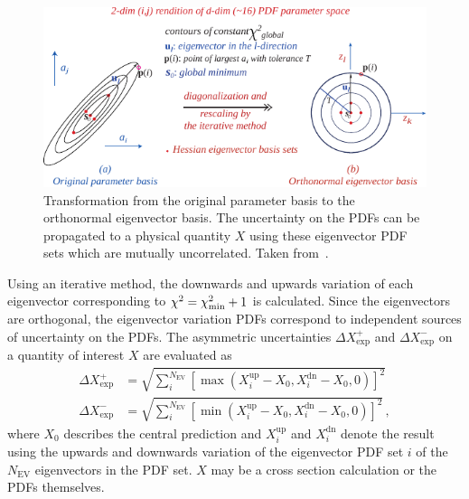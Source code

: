 \begin{figure}[htb]
  \centering
  \includegraphics[width=1.0\textwidth]{figures/pdf_constraints/hessianmethod.pdf}
  \caption[Transformation of the parameter basis to the eigenvector basis]
    {Transformation from the original parameter basis to the orthonormal
    eigenvector basis. The uncertainty on the PDFs can be propagated to a
    physical quantity $X$ using these eigenvector PDF sets which are mutually
    uncorrelated. Taken from~\cite{Pumplin:2001ct}.}
    \label{fig:eigenvector_basis_set}
\end{figure}

Using an iterative method, the downwards and upwards variation of each
eigenvector corresponding to $\chi^2 = \chi^2_{\mathrm{min}} + 1$ is calculated.
Since the eigenvectors are orthogonal, the eigenvector variation PDFs correspond
to independent sources of uncertainty on the PDFs. The asymmetric uncertainties
$\Delta X_{\mathrm{exp}}^+$ and $\Delta X_{\mathrm{exp}}^-$ on a quantity of
interest $X$ are evaluated as
%
\begin{align*}
  \Delta X^+_{\mathrm{exp}} &= \sqrt{\sum_i^{N_{\mathrm{EV}}} \left[ \max(X_i^{\mathrm{up}}
    -X_0, X_i^{\mathrm{dn}} - X_0, 0)\right]^2}\\
    \Delta X^-_{\mathrm{exp}} &= \sqrt{\sum_i^{N_{\mathrm{EV}}} \left[
    \min(X_i^{\mathrm{up}} - X_0, X_i^{\mathrm{dn}} - X_0,0)\right]^2}\,,
\end{align*}
%
where $X_0$ describes the central prediction and $X_i^{\mathrm{up}}$ and
$X_i^{\mathrm{dn}}$ denote the result using the upwards and downwards variation of
the eigenvector PDF set $i$ of the $N_{\mathrm{EV}}$ eigenvectors in the PDF
set. $X$ may be a cross section calculation or the PDFs themselves.

